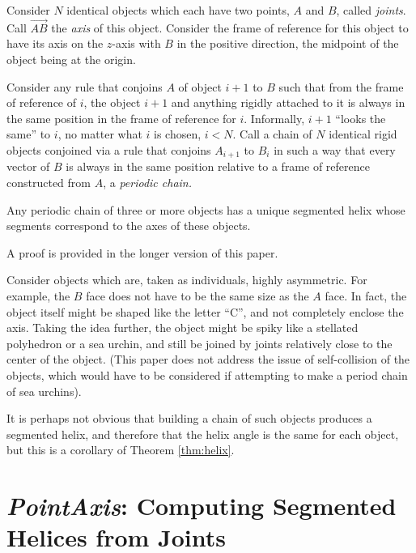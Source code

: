 \documentclass{svproc}
\begin{document}
\begin{theorem}
  \label{thm:helix}
  Consider $N$ identical objects which each have two points, $A$ and $B$, called {\em joints}. Call
  $\overrightarrow{AB}$ the {\em axis} of this object.
  Consider the frame of reference for this object to have
  its axis on the $z$-axis with $B$ in the positive direction, the
  midpoint of the object being at the origin.

  Consider any rule that conjoins $A$ of object $i+1$ to $B$ such that
  from the frame of reference of $i$, the object $i+1$ and anything rigidly
  attached to it is always in the same position in the frame of reference for $i$.
  Informally, $i+1$ ``looks the same'' to $i$, no matter what $i$ is chosen, $i < N$.
  Call a chain of $N$ identical rigid objects conjoined via a rule that
  conjoins $A_{i+1}$ to $B_i$ in such a way that every vector
  of $B$ is always in the same position relative to a frame of reference
  constructed from $A$, a {\em periodic chain.}

  Any periodic chain of three or more objects has a unique segmented helix
  whose segments correspond
  to the axes of these objects.
\end{theorem}

A proof is provided in the longer version of this paper\cite{readfullsegmentedhelix}.

Consider
objects which are, taken as individuals, highly asymmetric.
For example,
the $B$ face does not have to be the same size as the $A$ face. In fact,
the object itself might be shaped like the letter ``C'', and not completely
enclose the axis. Taking the idea further, the object might be spiky
like a stellated polyhedron or a sea urchin, and still be joined by
joints relatively close to the center of the object. (This paper does not
address the issue of self-collision of the objects,
which would have to be considered if attempting to make a period chain
of sea urchins).

It is perhaps not obvious that building a chain of such objects
produces a segmented helix, and therefore that the helix angle is the
same for each object, but this is a corollary of Theorem \ref{thm:helix}.

\section{{\em PointAxis}: Computing Segmented Helices from Joints}
\label{sec:pointaxis}
\end{document}
